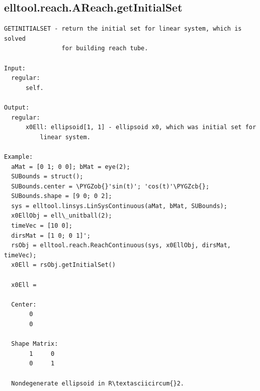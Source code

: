 \documentclass[letterpaper,10pt,english]{sphinxmanual}
\def\PYGZob{\char`\{}
\def\PYGZcb{\char`\}}
\begin{document}
\subsection{elltool.reach.AReach.getInitialSet}
\label{chap_functions:elltool-reach-areach-getinitialset}
\begin{Verbatim}[commandchars=\\\{\}]
GETINITIALSET - return the initial set for linear system, which is solved
                for building reach tube.

Input:
  regular:
      self.

Output:
  regular:
      x0Ell: ellipsoid[1, 1] - ellipsoid x0, which was initial set for
          linear system.

Example:
  aMat = [0 1; 0 0]; bMat = eye(2);
  SUBounds = struct();
  SUBounds.center = \PYGZob{}'sin(t)'; 'cos(t)'\PYGZcb{};
  SUBounds.shape = [9 0; 0 2];
  sys = elltool.linsys.LinSysContinuous(aMat, bMat, SUBounds);
  x0EllObj = ell\_unitball(2);
  timeVec = [10 0];
  dirsMat = [1 0; 0 1]';
  rsObj = elltool.reach.ReachContinuous(sys, x0EllObj, dirsMat, timeVec);
  x0Ell = rsObj.getInitialSet()

  x0Ell =

  Center:
       0
       0

  Shape Matrix:
       1     0
       0     1

  Nondegenerate ellipsoid in R\textasciicircum{}2.
\end{Verbatim}
\end{document}
